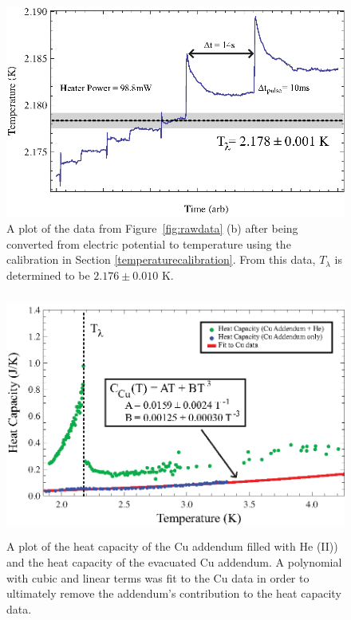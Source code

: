 \begin{figure}[htbp]
\begin{center}
\includegraphics[height=70mm]{./figures/heatingdata.eps}
\caption{\small{A plot of the data from Figure~\ref{fig:rawdata} (b) after being converted from electric potential to temperature using the calibration in Section \ref{temperaturecalibration}.  From this data, $T_{\lambda}$ is determined to be $2.176\pm0.010$ K.}}
\label{fig:heatingdata}
\end{center}
\end{figure}

\begin{figure}[htbp]
\begin{center}
\includegraphics[height=80mm]{./figures/lambdanorm.eps}
\caption{\small{A plot of the heat capacity of the Cu addendum filled with He (II)) and the heat capacity of the evacuated Cu addendum.  A polynomial with cubic and linear terms was fit to the Cu data in order to ultimately remove the addendum's contribution to the heat capacity data.}}
\label{fig:lambdanorm}
\end{center}
\end{figure}

